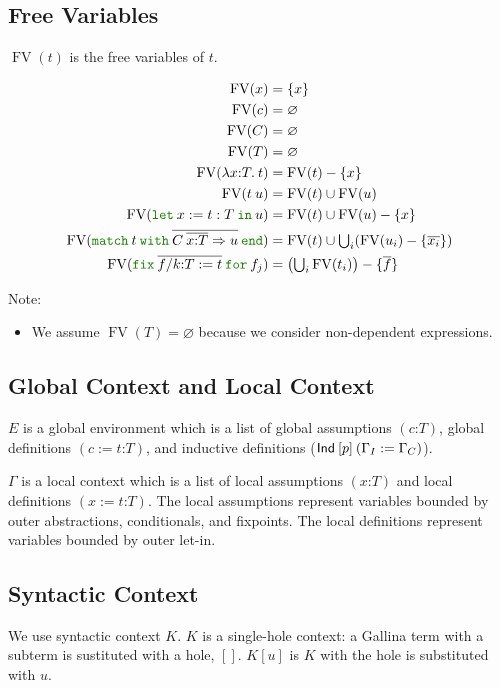 \documentclass[a4paper,fleqn]{article}
\def\gallina{\textrm{Gallina}}
\newcommand{\kwlet}{\mbox{\color{mygreen}\ttfamily let}}
\newcommand{\kwin}{\mbox{\color{mygreen}\ttfamily in}}
\newcommand{\kwmatch}{\mbox{\color{mygreen}\ttfamily match}}
\newcommand{\kwwith}{\mbox{\color{mygreen}\ttfamily with}}
\newcommand{\kwend}{\mbox{\color{mygreen}\ttfamily end}}
\newcommand{\kwfix}{\mbox{\color{mygreen}\ttfamily fix}}
\newcommand{\kwfor}{\mbox{\color{mygreen}\ttfamily for}}
\newcommand{\lamT}[3]{\lambda #1\mathord{:}#2.\:#3}
\newcommand{\gassum}[2]{(#1\mathord{:}#2)}
\newcommand{\glodef}[3]{(#1:=#2\mathord{:}#3)}
\newcommand{\lassum}[2]{(#1\mathord{:}#2)}
\newcommand{\ldef}[3]{(#1:=#2\mathord{:}#3)}
\newcommand{\letin}[3]{\kwlet\:#1:=#2\:\kwin\:#3}
\newcommand{\omatch}[2]{\kwmatch\:#1\:\kwwith\:{#2}\:\kwend}
\newcommand{\ofix}[2]{\kwfix\:{#1}\:\kwfor\:{#2}}
\DeclareMathOperator{\FV}{FV}
\newcommand{\tbigcup}{{\textstyle\bigcup}}
\newcommand{\rep}[1]{\overline{#1}}
\begin{document}
\subsection{Free Variables}

$\FV(t)$ is the free variables of $t$.

\begin{align*}
  \FV(x) &= \{x\} \\
  \FV(c) &= \varnothing \\
  \FV(C) &= \varnothing \\
  \FV(T) &= \varnothing \\
  \FV(\lamT{x}{T}{t}) &= \FV(t) - \{x\} \\
  \FV(t\:u) &= \FV(t) \cup \FV(u) \\
  \FV(\letin{x}{t:T}{u}) &= \FV(t) \cup \FV(u) - \{x\} \\
  \FV(\omatch{t}{\rep{C\:\rep{x{:}T}\Rightarrow u}}) &= \FV(t) \cup \tbigcup_i (\FV(u_i) - \{\rep{x_i}\}) \\
  \FV(\ofix{\rep{f/k{:}T:=t}}{f_j}) &= \big(\tbigcup_i \FV(t_i)\big) - \{\rep{f}\}
\end{align*}
{\small Note:
\begin{itemize}
  \item We assume $\FV(T) = \varnothing$ because we consider non-dependent expressions.
\end{itemize}}

\subsection{Global Context and Local Context}

$E$ is a global environment which is a list of
global assumptions $\gassum{c}{T}$,
global definitions $\glodef{c}{t}{T}$, and
inductive definitions ($\text{\sf Ind}\:[p]\:(\Gamma_I := \Gamma_C)$).

$\Gamma$ is a local context which is a list of
local assumptions $\lassum{x}{T}$ and
local definitions $\ldef{x}{t}{T}$.
The local assumptions represent variables bounded by outer abstractions, conditionals, and fixpoints.
The local definitions represent variables bounded by outer let-in.

\subsection{Syntactic Context}

We use syntactic context $K$.
$K$ is a single-hole context: a \gallina{} term with a subterm is sustituted with a hole, $[]$.
$K[u]$ is $K$ with the hole is substituted with $u$.
\end{document}
